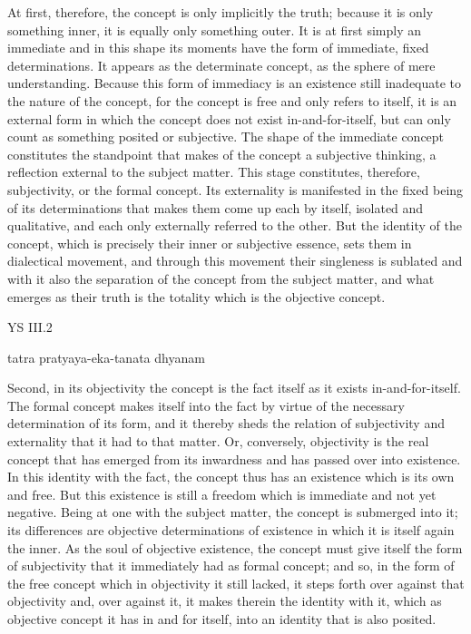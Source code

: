 At first, therefore, the concept is
only implicitly the truth;
because it is only something inner,
it is equally only something outer.
It is at first simply an immediate
and in this shape its moments have
the form of immediate, fixed determinations.
It appears as the determinate concept,
as the sphere of mere understanding.
Because this form of immediacy is an existence
still inadequate to the nature of the concept,
for the concept is free and only refers to itself,
it is an external form in which the concept
does not exist in-and-for-itself,
but can only count as something posited or subjective.
The shape of the immediate concept
constitutes the standpoint that makes
of the concept a subjective thinking,
a reflection external to the subject matter.
This stage constitutes, therefore, subjectivity,
or the formal concept.
Its externality is manifested in
the fixed being of its determinations
that makes them come up each by itself,
isolated and qualitative,
and each only externally referred to the other.
But the identity of the concept,
which is precisely their inner or subjective essence,
sets them in dialectical movement,
and through this movement their singleness is sublated
and with it also the separation of
the concept from the subject matter,
and what emerges as their truth is
the totality which is the objective concept.

YS III.2

    tatra pratyaya-eka-tanata dhyanam

Second, in its objectivity the concept is
the fact itself as it exists in-and-for-itself.
The formal concept makes itself into the fact
by virtue of the necessary determination of its form,
and it thereby sheds the relation
of subjectivity and externality
that it had to that matter.
Or, conversely, objectivity is the real concept
that has emerged from its inwardness
and has passed over into existence.
In this identity with the fact,
the concept thus has an existence
which is its own and free.
But this existence is still a freedom
which is immediate and not yet negative.
Being at one with the subject matter,
the concept is submerged into it;
its differences are objective
determinations of existence
in which it is itself again the inner.
As the soul of objective existence,
the concept must give itself the form of subjectivity
that it immediately had as formal concept;
and so, in the form of the free concept
which in objectivity it still lacked,
it steps forth over against that objectivity
and, over against it, it makes therein the identity with it,
which as objective concept it has in and for itself,
into an identity that is also posited.

